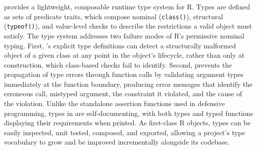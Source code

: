  provides a lightweight, composable runtime type system for R. Types are defined as sets of predicate traits, which compose nominal (\texttt{class()}), structural (\texttt{typeof()}), and value-level checks to describe the restrictions a valid object must satisfy. The type system addresses two failure modes of R's permissive nominal typing. First, 's explicit type definitions can detect a structurally malformed object of a given class at any point in the object's lifecycle, rather than only at construction, which class-based checks fail to identify. Second,  prevents the propagation of type errors through function calls by validating argument types immediately at the function boundary, producing error messages that identify the erroneous call, mistyped argument, the constraint it violated, and the cause of the violation. Unlike the standalone assertion functions used in defensive programming, types in  are self-documenting, with both types and typed functions displaying their requirements when printed. As first-class R objects, types can be easily inspected, unit tested, composed, and exported, allowing a project's type vocabulary to grow and be improved incrementally alongside its codebase.



\address{%
Ethan Sansom\\
University of Toronto\\%
\\
%
%
%
%
}
